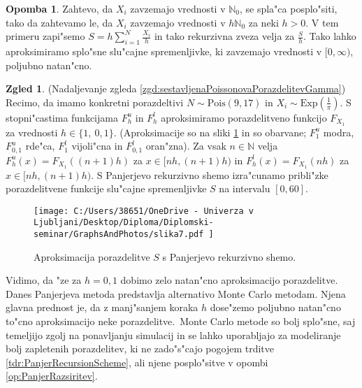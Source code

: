 \documentclass[12pt, a4paper, reqno]{amsart}
\theoremstyle{definition}
\newtheorem{zgled}[definicija]{Zgled}
\newtheorem{opomba}[definicija]{Opomba}
\theoremstyle{plain}
\newcommand{\N}{\mathbb{N}}
\newcommand{\1}{\mathds{1}}
\newcommand{\Pois}[1]{\text{Pois}(#1)}
\begin{document}
    \begin{opomba}
        Zahtevo, da $X_i$ zavzemajo vrednosti v $\N_0$, se spla"ca posplo"siti, tako da 
        zahtevamo le, da $X_i$ zavzemajo vrednosti v $h\N_0$ za neki $h>0$. V tem primeru 
        zapi"semo $S = h\sum_{i=1}^N\frac{X_i}{h}$ in tako rekurzivna zveza velja za $\frac{S}{h}$. 
        Tako lahko aproksimiramo splo"sne slu"cajne 
        spremenljivke, ki zavzemajo vrednosti v $[0, \infty)$, poljubno natan"cno.
    \end{opomba}  

    \begin{zgled}(Nadaljevanje zgleda \ref{zgd:sestavljenaPoissonovaPorazdelitevGamma}) Recimo, da imamo
        konkretni porazdeltivi $N\sim\Pois{9{,}17}$ in $X_i\sim\text{Exp}(\frac{1}{\pi})$. S stopni"castima funkcijama
        $F^u_h$ in $F_h^l$ aproksimiramo porazdelitveno funkcijo $F_{X_1}$ za vrednosti $h \in \{1, \ 0{,}1\}$. 
        (Aproksimacije so na sliki \ref{fig:slika7} in so obarvane;  $F^u_{1}$ modra, $F^u_{0{,}1}$ 
        rde"ca, $F^l_{1}$ vijoli"cna in $F^l_{0{,}1}$ oran"zna).
        Za vsak $n\in\N$ velja $F^u_h(x) = F_{X_1}((n+1)h)$ za $x\in\bigl[nh, (n+1)h\bigr)$ in 
        $F^l_h(x) = F_{X_1}(nh)$ za $x\in\bigl[nh, (n+1)h\bigr)$.
        S Panjerjevo rekurzivno shemo izra"cunamo pribli"zke porazdelitvene funkcije slu"cajne 
        spremenljivke $S$ na intervalu $[0, 60]$.  
 
        \begin{figure}[h!]
            \begin{center}
                \texttt{[image: 
                    C:/Users/38651/OneDrive - Univerza v Ljubljani/Desktop/Diploma/Diplomski-seminar/GraphsAndPhotos/slika7.pdf
                ]}
                \caption{Aproksimacija porazdelitve $S$ s Panjerjevo rekurzivno shemo.}
                \label{fig:slika7}
            \end{center}
        \end{figure}
        
    \pagebreak
    Vidimo, da "ze za $h = 0{,}1$ dobimo zelo natan"cno aproksimacijo porazdelitve. Danes 
    Panjerjeva metoda predstavlja alternativo Monte Carlo metodam. Njena glavna prednost 
    je, da z manj"sanjem koraka $h$ dose"zemo poljubno natan"cno to"cno aproksimacijo neke porazdelitve.\ 
    Monte Carlo metode so bolj splo"sne, saj temeljijo zgolj na ponavljanju simulacij in se lahko uporabljajo za modeliranje bolj zapletenih 
    porazdelitev, ki ne zado"s"cajo pogojem trditve \ref{tdr:PanjerRecursionScheme}, ali njene posplo"sitve
    v opombi \ref{op:PanjerRazsiritev}. 

    \label{zgd:PanjerExp}  
    \end{zgled}
\end{document}
